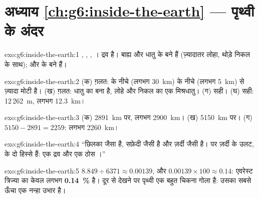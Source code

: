 \section*{अध्याय \ref{ch:g6:inside-the-earth} --- पृथ्वी के अंदर}

\begin{solution}{exo:g6:inside-the-earth:1}
, , , । 
द्रव है। बाह्य और  धातु के बने हैं (ज़्यादातर लोहा, थोड़े
निकल के साथ);  और   के बने हैं।
\end{solution}

\begin{solution}{exo:g6:inside-the-earth:2}
(क) ग़लत:   के नीचे (लगभग 30~km)  के नीचे (लगभग 5~km)
से ज़्यादा मोटी है। (ख) ग़लत:  धातु का बना है, लोहे और निकल का एक
मिश्रधातु। (ग) सही। (घ) सही: 12\,262~m, लगभग 12.3~km।
\end{solution}

\begin{solution}{exo:g6:inside-the-earth:3}
(क) 2891~km पर, लगभग 2900~km। (ख) 5150~km पर। (ग) $5150 - 2891 = 2259$:
लगभग 2260~km।
\end{solution}

\begin{solution}{exo:g6:inside-the-earth:4}
``छिलका \underline{} जैसा है, सफ़ेदी
\underline{} जैसी है और ज़र्दी \underline{} जैसी है। पर
ज़र्दी के उलट, \underline{} के दो हिस्से हैं: एक द्रव \underline{}
और एक ठोस \underline{}।''
\end{solution}

\begin{solution}{exo:g6:inside-the-earth:5}
$8.849 \div 6371 \approx 0.00139$, और $0.00139 \times 100 \approx 0.14$:
एवरेस्ट त्रिज्या का केवल लगभग \textbf{0.14~\%} है। दूर से देखने पर
पृथ्वी एक बहुत चिकना गोला है: उसका सबसे ऊँचा  एक नन्हा उभार है।
\end{solution}

